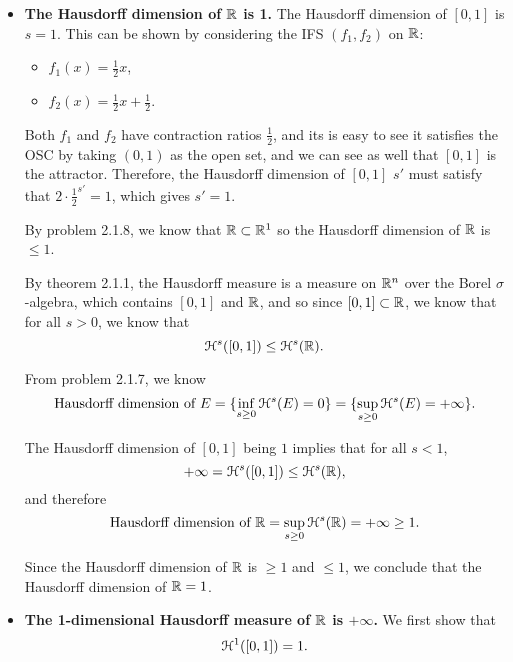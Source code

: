 \begin{itemize}
    \item \textbf{The Hausdorff dimension of \(\mathbb{R}\) is 1.} The Hausdorff dimension of \([0, 1]\) is \(s = 1\). This can be shown by considering the IFS \((f_1, f_2)\) on \(\mathbb{R}\):
    \begin{itemize}
        \item \(f_1(x) = \frac{1}{2}x\),
        \item \(f_2(x) = \frac{1}{2} x + \frac{1}{2}\).
    \end{itemize}
    
    Both \(f_1\) and \(f_2\) have contraction ratios \(\frac{1}{2}\), and its is easy to see it satisfies the OSC by taking \((0, 1)\) as the open set, and we can see as well that \([0, 1]\) is the attractor. Therefore, the Hausdorff dimension of \([0, 1]\) \(s'\) must satisfy that \(2 \cdot \frac{1}{2}^{s'} = 1\), which gives \(s' = 1\).
    
    By problem 2.1.8, we know that \(\mathbb{R} \subset \mathbb{R}^1\) so the Hausdorff dimension of \(\mathbb{R}\) is \(\leq 1\).
    
    By theorem 2.1.1, the Hausdorff measure is a measure on \(\mathbb{R}^n\) over the Borel \(\sigma\)-algebra, which contains \([0, 1]\) and \(\mathbb{R}\), and so since \([0, 1] \subset \mathbb{R}\), we know that for all \(s > 0\), we know that
    \[
    \mathcal{H}^s([0, 1]) \leq \mathcal{H}^s(\mathbb{R}).
    \]
    
    From problem 2.1.7, we know
    \[
    \text{Hausdorff dimension of } E = \{\inf_{s \geq 0}{\mathcal{H}^s(E) = 0}\} = \{\sup_{s \geq 0}{\mathcal{H}^s(E) = +\infty}\}.
    \]
    
    The Hausdorff dimension of \([0, 1]\) being \(1\) implies that for all \(s < 1\),
    \[
    +\infty = \mathcal{H}^s([0, 1]) \leq \mathcal{H}^s(\mathbb{R}),
    \]
    and therefore 
    \[
    \text{Hausdorff dimension of } \mathbb{R} = \sup_{s \geq 0}{\mathcal{H}^s(\mathbb{R}) = +\infty} \geq 1.
    \]
    
    Since the Hausdorff dimension of \(\mathbb{R}\) is \(\geq 1\) and \(\leq 1\), we conclude that the Hausdorff dimension of \(\mathbb{R} = 1\).

    \item \textbf{The 1-dimensional Hausdorff measure of \(\mathbb{R}\) is \(+\infty\).} We first show that
    \[\mathcal{H}^1 ([0, 1]) = 1.\]
    

\end{itemize}
